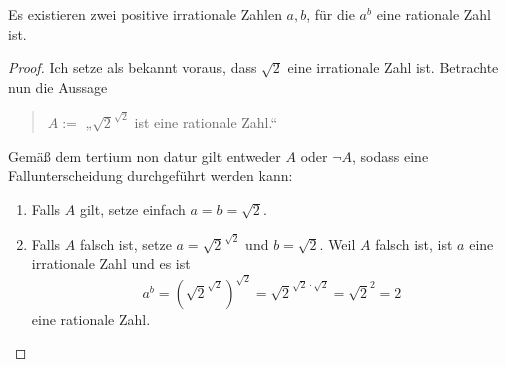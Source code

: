 \begin{bsp}
    Es existieren zwei positive irrationale Zahlen $a,b$, für die $a^b$ eine rationale Zahl ist.
\end{bsp}
\begin{proof}
    Ich setze als bekannt voraus, dass $\sqrt{2}$ eine irrationale Zahl ist. Betrachte nun die Aussage
    \begin{quote}
        $A:=$ „$\sqrt{2}^{\sqrt{2}}$ ist eine rationale Zahl.“
    \end{quote}
    Gemäß dem tertium non datur gilt entweder $A$ oder $\neg A$, sodass eine Fallunterscheidung durchgeführt werden kann:
    \begin{enumerate}[1)]
        \item Falls $A$ gilt, setze einfach $a=b=\sqrt{2}$.
        \item Falls $A$ falsch ist, setze $a=\sqrt{2}^{\sqrt{2}}$ und $b=\sqrt{2}$. Weil $A$ falsch ist, ist $a$ eine irrationale Zahl und es ist
            \[ a^b = (\sqrt{2}^{\sqrt{2}})^{\sqrt{2}} = \sqrt{2}^{\sqrt{2}\cdot\sqrt{2}} = \sqrt{2}^2 = 2 \]
        eine rationale Zahl. \qedhere
    \end{enumerate}
\end{proof}

